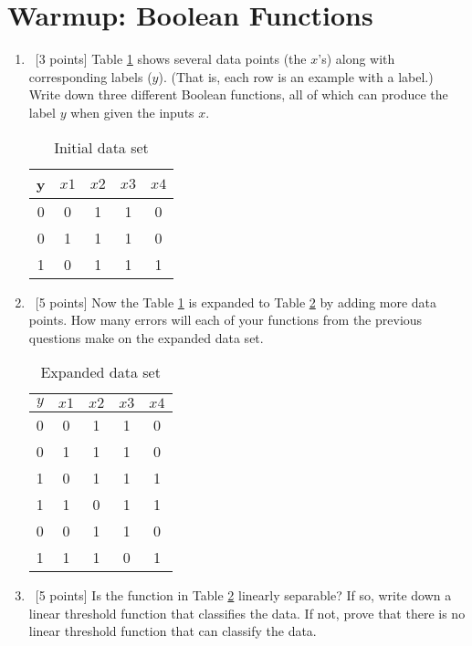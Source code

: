 \section{Warmup: Boolean Functions}
\label{sec:boolean-functions}

\begin{enumerate}
\item ~[3 points] Table \ref{tab:boolean-function-data-1} shows
  several data points (the $x$'s) along with corresponding labels
  ($y$). (That is, each row is an example with a label.) Write down
  three different Boolean functions, all of which can produce the
  label $y$ when given the inputs $x$.

  \begin{table}[h]
    \centering
    \begin{tabular}{ccccc}
      \toprule
      y & $x1$ & $x2$ & $x3$ & $x4$ \\
      \midrule
      0 & 0    & 1    & 1    & 0    \\
      0 & 1    & 1    & 1    & 0    \\
      1 & 0    & 1    & 1    & 1    \\
      \bottomrule
    \end{tabular}
    \caption{Initial data set}
    \label{tab:boolean-function-data-1}
  \end{table}
  
\item ~[5 points] Now the Table \ref{tab:boolean-function-data-1} is
  expanded to Table \ref{tab:boolean-function-data-2} by adding more
  data points. How many errors will each of your functions from the
  previous questions make on the expanded data set.

  \begin{table}[h]
    \centering
    \begin{tabular}{ccccc}
      \toprule
      $y$ & $x1$ & $x2$ & $x3$ & $x4$ \\
      \midrule
      0 & 0    & 1    & 1    & 0    \\
      0 & 1    & 1    & 1    & 0    \\
      1 & 0    & 1    & 1    & 1    \\
      1 & 1    & 0    & 1    & 1    \\
      0 & 0    & 1    & 1    & 0    \\
      1 & 1    & 1    & 0    & 1    \\
      \bottomrule
    \end{tabular}
    \caption{Expanded data set}
    \label{tab:boolean-function-data-2}
  \end{table}
  
\item ~[5 points] Is the function in Table
  \ref{tab:boolean-function-data-2} linearly separable? If so, write
  down a linear threshold function that classifies the data. If not,
  prove that there is no linear threshold function that can classify
  the data.
\end{enumerate}

